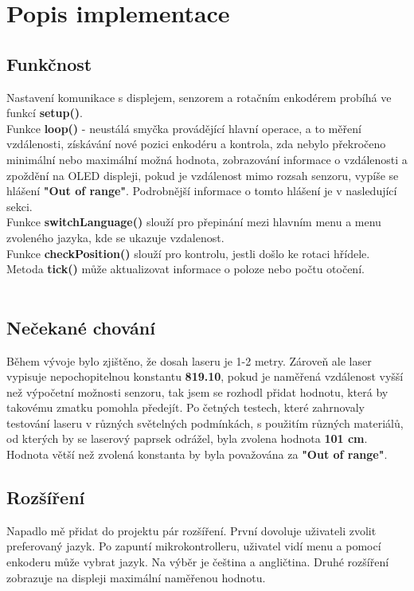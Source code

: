 \graphicspath{{Images/}}
\hypersetup{linkcolor=blue, urlcolor=blue}

\section{Popis implementace}

\begin{spacing}{1.5}
    \subsection{Funkčnost}
    \fontsize{14}{14}\selectfont
    Nastavení komunikace s displejem, senzorem a rotačním enkodérem probíhá ve funkcí \textbf{setup()}.
    \\
    Funkce \textbf{loop()} - neustálá smyčka provádějící hlavní operace, a to měření vzdálenosti, získávání nové pozici enkodéru a kontrola, zda nebylo překročeno minimální nebo maximální možná hodnota, zobrazování informace o vzdálenosti a zpoždění na OLED displeji, pokud je vzdálenost mimo rozsah senzoru, vypíše se hlášení \textbf{"Out of range"}. Podrobnější informace o tomto hlášení je v nasledující sekci.
    \\
    Funkce \textbf{switchLanguage()} slouží pro přepinání mezi hlavním menu a menu zvoleného jazyka, kde se ukazuje vzdalenost.
    \\
    Funkce \textbf{checkPosition()} slouží pro kontrolu, jestli došlo ke rotaci hřídele. Metoda \textbf{tick()} může aktualizovat informace o poloze nebo počtu otočení.
    \\
    \\
    \subsection{Nečekané chování}
    \fontsize{14}{14}\selectfont
    Během vývoje bylo zjištěno, že dosah laseru je 1-2 metry. Zároveň ale laser vypisuje nepochopitelnou konstantu \textbf{819.10}, pokud je naměřená vzdálenost vyšší než výpočetní možnosti senzoru, tak jsem se rozhodl přidat hodnotu, která by takovému zmatku pomohla předejít. Po četných testech, které zahrnovaly testování laseru v různých světelných podmínkách, s použitím různých materiálů, od kterých by se laserový paprsek odrážel, byla zvolena hodnota \textbf{101 cm}. Hodnota větší než zvolená konstanta by byla považována za \textbf{"Out of range"}.
    \\
    \subsection{Rozšíření}
    \fontsize{14}{14}\selectfont
    Napadlo mě přidat do projektu pár rozšíření. První dovoluje uživateli zvolit preferovaný jazyk. Po zapuntí mikrokontrolleru, uživatel vidí menu a pomocí enkoderu může vybrat jazyk. Na výběr je čeština a angličtina. Druhé rozšíření zobrazuje na displeji maximální naměřenou hodnotu.
    
\end{spacing}